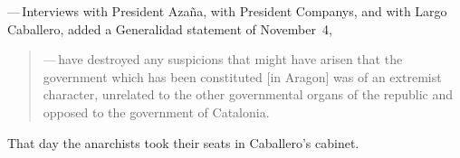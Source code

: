 —\,Interviews with President Azaña, with President Companys, and with Largo Caballero, added a Generalidad statement of November~4,

\begin{quotation}
  \noindent
  —\,have destroyed any suspicions that might have arisen that the government which has been constituted [in Aragon] was of an extremist character, unrelated to the other governmental organs of the republic and opposed to the government of Catalonia.
\end{quotation}
 
\noindent
That day the anarchists took their seats in Caballero’s cabinet.